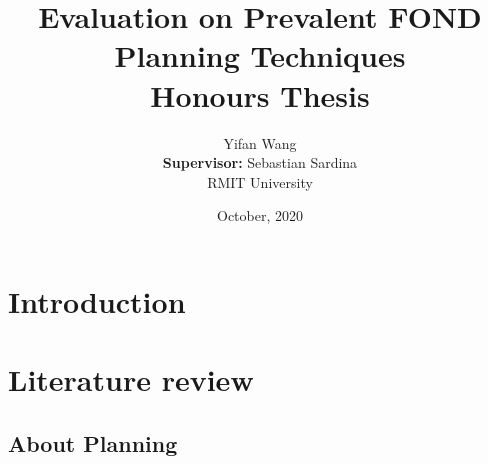 \documentclass[a4paper,12pt]{article}
\begin{document}
\title{Evaluation on Prevalent FOND Planning Techniques\\
\large Honours Thesis }

\author{Yifan Wang \\
\textbf{Supervisor: }Sebastian Sardina\\
{\small RMIT University}
}

\date{October, 2020}
\maketitle


\section{Introduction}


\section{Literature review}

\subsection{About Planning}
\end{document}
